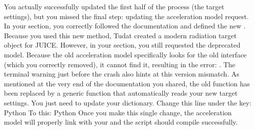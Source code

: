 {}You actually successfully updated the first half of the process (the target settings), but you missed the final step: updating the acceleration model request.\markdownRendererInterblockSeparator
{}\markdownRendererSectionBegin
{}\markdownRendererInterblockSeparator
{}In your  section, you correctly followed the documentation and defined the new . Because you used this new method, Tudat created a modern radiation target object for JUICE.\markdownRendererInterblockSeparator
{}However, in your  section, you still requested the deprecated  model. Because the old acceleration model specifically looks for the old interface (which you correctly removed), it cannot find it, resulting in the error: . The terminal warning just before the crash also hints at this version mismatch.\markdownRendererInterblockSeparator
{}
\markdownRendererSectionEnd \markdownRendererSectionBegin
{}\markdownRendererInterblockSeparator
{}As mentioned at the very end of the documentation you shared, the old  function has been replaced by a generic  function that automatically reads your new target settings.\markdownRendererInterblockSeparator
{}You just need to update your  dictionary.\markdownRendererInterblockSeparator
{}Change this line under the  key:\markdownRendererInterblockSeparator
{}Python\markdownRendererInterblockSeparator
{}\markdownRendererInterblockSeparator
{}To this:\markdownRendererInterblockSeparator
{}Python\markdownRendererInterblockSeparator
{}\markdownRendererInterblockSeparator
{}Once you make this single change, the acceleration model will properly link with your  and the script should compile successfully.\markdownRendererInterblockSeparator
